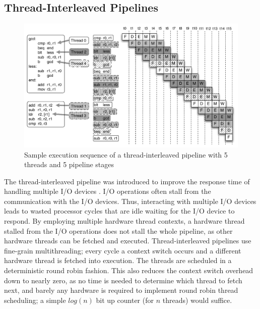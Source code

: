 \subsection{Thread-Interleaved Pipelines}
\label{subsection:pret_thread_pipeline}
\begin{figure}
  \vspace{-20pt}
  \begin{center}
    \includegraphics[scale=.55]{figs/thread-interleaved-execution}
  \end{center}
  \vspace{-20pt}
  \caption{Sample execution sequence of a thread-interleaved pipeline with 5 threads and 5 pipeline stages}
  \label{fig:execution_thread_interleaved_pipeline}
\end{figure}
The thread-interleaved pipeline was introduced to improve the response time of handling multiple I/O devices .
I/O operations often stall from the communication with the I/O devices.
Thus, interacting with multiple I/O devices leads to wasted processor cycles that are idle waiting for the I/O device to respond.
By employing multiple hardware thread contexts, a hardware thread stalled from the I/O operations does not stall the whole pipeline, as other hardware threads can be fetched and executed.
Thread-interleaved pipelines use fine-grain multithreading; every cycle a context switch occurs and a different hardware thread is fetched into execution. 
The threads are scheduled in a deterministic round robin fashion. 
This also reduces the context switch overhead down to nearly zero, as no time is needed to determine which thread to fetch next, and barely any hardware is required to implement round robin thread scheduling; a simple $log(n)$ bit up counter (for $n$ threads) would suffice.         
